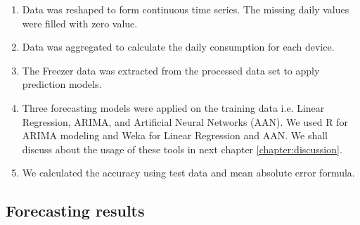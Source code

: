 \begin{enumerate}
\item Data was reshaped to form continuous time series. The missing daily values were filled with zero value.
\item Data was aggregated to calculate the daily consumption for each device.
\item  The Freezer data was extracted from the processed data set to apply prediction models.
\item  Three forecasting models were applied on the training data i.e. Linear Regression, ARIMA, and Artificial Neural Networks (AAN). We used R for ARIMA modeling and Weka for Linear Regression and AAN. We shall discuss about the usage of these tools in next chapter \ref{chapter:discussion}. 
\item We calculated the accuracy using test data and mean absolute error formula.  
\end{enumerate} 

\subsection{Forecasting results}

